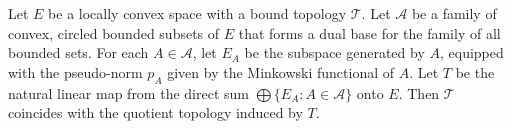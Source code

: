 Let $E$ be a locally convex space with a bound topology $\mathcal{T}$. Let $\mathcal{A}$ be a family of convex, circled bounded subsets of $E$ that forms a dual base for the family of all bounded sets. For each $A \in \mathcal{A}$, let $E_A$ be the subspace generated by $A$, equipped with the pseudo-norm $p_A$ given by the Minkowski functional of $A$. Let $T$ be the natural linear map from the direct sum $\bigoplus \{E_A : A \in \mathcal{A}\}$ onto $E$. Then $\mathcal{T}$ coincides with the quotient topology induced by $T$.
